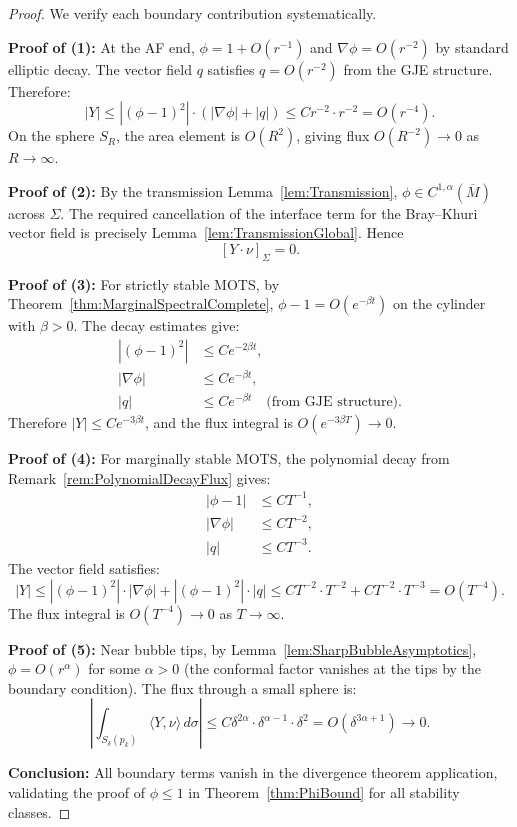 \begin{proof}
We verify each boundary contribution systematically.

\textbf{Proof of (1):} At the AF end, $\phi = 1 + O(r^{-1})$ and $\nabla\phi = O(r^{-2})$ by standard elliptic decay. The vector field $q$ satisfies $q = O(r^{-2})$ from the GJE structure. Therefore:
\[
    |Y| \le |(\phi-1)^2| \cdot (|\nabla\phi| + |q|) \le C r^{-2} \cdot r^{-2} = O(r^{-4}).
\]
On the sphere $S_R$, the area element is $O(R^2)$, giving flux $O(R^{-2}) \to 0$ as $R \to \infty$.

\textbf{Proof of (2):} By the transmission Lemma~\ref{lem:Transmission}, $\phi \in C^{1,\alpha}(\overline{M})$ across $\Sigma$. The required cancellation of the interface term for the Bray--Khuri vector field is precisely Lemma~\ref{lem:TransmissionGlobal}. Hence
\[
    [Y \cdot \nu]_\Sigma = 0.
\]

\textbf{Proof of (3):} For strictly stable MOTS, by Theorem~\ref{thm:MarginalSpectralComplete}, $\phi - 1 = O(e^{-\beta t})$ on the cylinder with $\beta > 0$. The decay estimates give:
\begin{align}
    |(\phi-1)^2| &\le C e^{-2\beta t}, \\
    |\nabla\phi| &\le C e^{-\beta t}, \\
    |q| &\le C e^{-\beta t} \quad \text{(from GJE structure)}.
\end{align}
Therefore $|Y| \le C e^{-3\beta t}$, and the flux integral is $O(e^{-3\beta T}) \to 0$.

\textbf{Proof of (4):} For marginally stable MOTS, the polynomial decay from Remark~\ref{rem:PolynomialDecayFlux} gives:
\begin{align}
    |\phi - 1| &\le C T^{-1}, \\
    |\nabla\phi| &\le C T^{-2}, \\
    |q| &\le C T^{-3}.
\end{align}
The vector field satisfies:
\[
    |Y| \le |(\phi-1)^2| \cdot |\nabla\phi| + |(\phi-1)^2| \cdot |q| \le C T^{-2} \cdot T^{-2} + C T^{-2} \cdot T^{-3} = O(T^{-4}).
\]
The flux integral is $O(T^{-4}) \to 0$ as $T \to \infty$.

\textbf{Proof of (5):} Near bubble tips, by Lemma~\ref{lem:SharpBubbleAsymptotics}, $\phi = O(r^\alpha)$ for some $\alpha > 0$ (the conformal factor vanishes at the tips by the boundary condition). The flux through a small sphere is:
\[
    \left| \int_{S_\delta(p_k)} \langle Y, \nu \rangle \, d\sigma \right| \le C \delta^{2\alpha} \cdot \delta^{\alpha-1} \cdot \delta^2 = O(\delta^{3\alpha+1}) \to 0.
\]

\textbf{Conclusion:} All boundary terms vanish in the divergence theorem application, validating the proof of $\phi \le 1$ in Theorem~\ref{thm:PhiBound} for all stability classes.
\end{proof}

